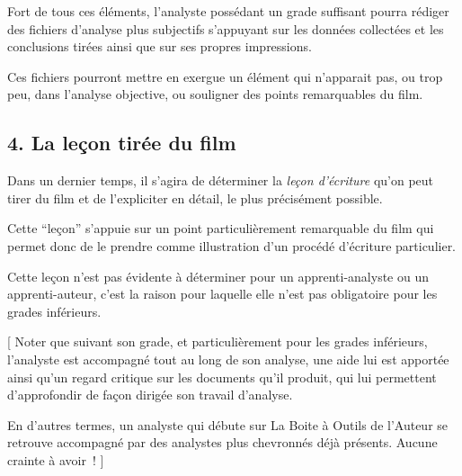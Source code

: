 Fort de tous ces éléments, l'analyste possédant un grade suffisant pourra rédiger des fichiers d'analyse plus subjectifs s'appuyant sur les données collectées et les conclusions tirées ainsi que sur ses propres impressions.

Ces fichiers pourront mettre en exergue un élément qui n'apparait pas, ou trop peu, dans l'analyse objective, ou souligner des points remarquables du film.

\subsection{4. La leçon tirée du film}\hypertarget{la-leon-tire-du-film}{}\label{la-leon-tire-du-film}

Dans un dernier temps, il s'agira de déterminer la \emph{leçon d'écriture} qu'on peut tirer du film et de l'expliciter en détail, le plus précisément possible.

Cette “leçon” s'appuie sur un point particulièrement remarquable du film qui permet donc de le prendre comme illustration d'un procédé d'écriture particulier.

Cette leçon n'est pas évidente à déterminer pour un apprenti-analyste ou un apprenti-auteur, c'est la raison pour laquelle elle n'est pas obligatoire pour les grades inférieurs.

[
Noter que suivant son grade, et particulièrement pour les grades inférieurs, l'analyste est accompagné tout au long de son analyse, une aide lui est apportée ainsi qu'un regard critique sur les documents qu'il produit, qui lui permettent d'approfondir de façon dirigée son travail d'analyse.

En d'autres termes, un analyste qui débute sur La Boite à Outils de l'Auteur se retrouve accompagné par des analystes plus chevronnés déjà présents. Aucune crainte à avoir~{}!
]

